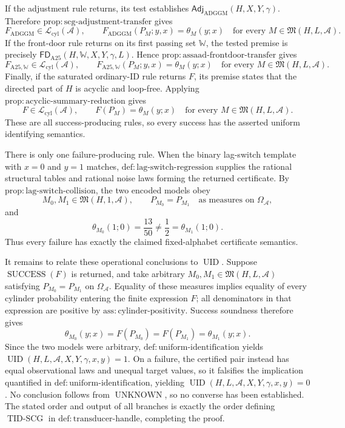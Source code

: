 If the adjustment rule returns, its test establishes \(\mathsf{Adj}_{\mathrm{ADGGM}}(H,X,Y,\gamma)\).  Therefore \(\mathrm{prop:scg\text{-}adjustment\text{-}transfer}\) gives
\[
F_{\mathrm{ADGGM}}\in\mathcal L_{\mathrm{cyl}}(\mathcal A),
\qquad
F_{\mathrm{ADGGM}}(P_M;y,x)=\theta_M(y;x)
\quad
\text{for every }M\in\mathfrak M(H,L,\mathcal A).
\]
If the front-door rule returns on its first passing set \(\mathbb W\), the tested premise is precisely \(\mathsf{FD}_{\mathrm{A25}}(H,\mathbb W,X,Y,\gamma,L)\).  Hence \(\mathrm{prop:assaad\text{-}frontdoor\text{-}transfer}\) gives
\[
F_{\mathrm{A25},\mathbb W}\in\mathcal L_{\mathrm{cyl}}(\mathcal A),
\qquad
F_{\mathrm{A25},\mathbb W}(P_M;y,x)=\theta_M(y;x)
\quad
\text{for every }M\in\mathfrak M(H,L,\mathcal A).
\]
Finally, if the saturated ordinary-ID rule returns \(F\), its premise states that the directed part of \(H\) is acyclic and loop-free.  Applying \(\mathrm{prop:acyclic\text{-}summary\text{-}reduction}\) gives
\[
F\in\mathcal L_{\mathrm{cyl}}(\mathcal A),
\qquad
F(P_M)=\theta_M(y;x)
\quad
\text{for every }M\in\mathfrak M(H,L,\mathcal A).
\]
These are all success-producing rules, so every success has the asserted uniform identifying semantics.

There is only one failure-producing rule.  When the binary lag-switch template with \(x=0\) and \(y=1\) matches, \(\mathrm{def:lag\text{-}switch\text{-}regression}\) supplies the rational structural tables and rational noise laws forming the returned certificate.  By \(\mathrm{prop:lag\text{-}switch\text{-}collision}\), the two encoded models obey
\[
M_0,M_1\in\mathfrak M(H,1,\mathcal A),
\qquad
P_{M_0}=P_{M_1}\quad\text{as measures on }\Omega_{\mathcal A},
\]
and
\[
\theta_{M_0}(1;0)=\frac{13}{50}
\neq\frac12=\theta_{M_1}(1;0).
\]
Thus every failure has exactly the claimed fixed-alphabet certificate semantics.

It remains to relate these operational conclusions to \(\operatorname{UID}\).  Suppose \(\operatorname{SUCCESS}(F)\) is returned, and take arbitrary \(M_0,M_1\in\mathfrak M(H,L,\mathcal A)\) satisfying \(P_{M_0}=P_{M_1}\) on \(\Omega_{\mathcal A}\).  Equality of these measures implies equality of every cylinder probability entering the finite expression \(F\); all denominators in that expression are positive by \(\mathrm{ass:cylinder\text{-}positivity}\).  Success soundness therefore gives
\[
\theta_{M_0}(y;x)=F(P_{M_0})=F(P_{M_1})=\theta_{M_1}(y;x).
\]
Since the two models were arbitrary, \(\mathrm{def:uniform\text{-}identification}\) yields \(\operatorname{UID}(H,L,\mathcal A,X,Y,\gamma,x,y)=1\).  On a failure, the certified pair instead has equal observational laws and unequal target values, so it falsifies the implication quantified in \(\mathrm{def:uniform\text{-}identification}\), yielding \(\operatorname{UID}(H,L,\mathcal A,X,Y,\gamma,x,y)=0\).  No conclusion follows from \(\operatorname{UNKNOWN}\), so no converse has been established.  The stated order and output of all branches is exactly the order defining \(\operatorname{TID\text{-}SCG}\) in \(\mathrm{def:transducer\text{-}handle}\), completing the proof.

